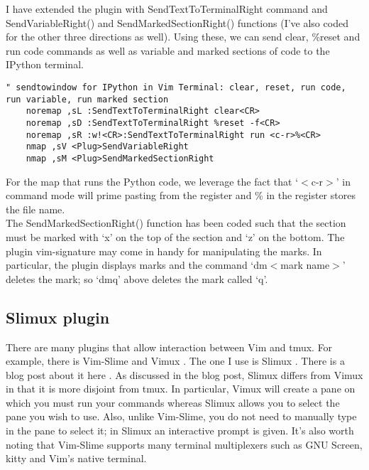 \documentclass[10pt]{article}
\newcommand{\tlangle}{$<$}
\newcommand{\trangle}{$>$}
\begin{document}
I have extended the plugin with SendTextToTerminalRight command and SendVariableRight()
and SendMarkedSectionRight() functions (I've also coded for the other three directions as
well). Using these, we can send clear, \%reset and run code commands as well as
variable and marked sections of code to the IPython terminal.
\begin{lstlisting}
" sendtowindow for IPython in Vim Terminal: clear, reset, run code, run variable, run marked section
    noremap ,sL :SendTextToTerminalRight clear<CR>
    noremap ,sD :SendTextToTerminalRight %reset -f<CR>
    noremap ,sR :w!<CR>:SendTextToTerminalRight run <c-r>%<CR>
    nmap ,sV <Plug>SendVariableRight
    nmap ,sM <Plug>SendMarkedSectionRight
\end{lstlisting}
For the map that runs the Python code, we leverage the fact that
`\tlangle c-r\trangle' in command mode will prime pasting from the register and
\% in the register stores the file name.\\

The SendMarkedSectionRight() function has been coded such that the section must
be marked with `x' on the top of the section and `z' on the bottom.  The plugin
vim-signature \cite{kshenoy2015signature} may come in handy for manipulating the
marks. In particular, the plugin displays marks and the command `dm\tlangle mark
name\trangle' deletes the mark; so `dmq' above deletes the mark called `q'.

\subsection{Slimux plugin}
There are many plugins that allow interaction between Vim and tmux. For example,
there is Vim-Slime \cite{jpalardy2012slime} and Vimux \cite{benmills2009vimux}.
The one I use is Slimux \cite{esamattis2015slimux}. There is a blog post about
it here \cite{suuronen2012slimux}. As discussed in the blog post, Slimux differs
from Vimux in that it is more disjoint from tmux. In particular, Vimux will
create a pane on which you must run your commands whereas Slimux allows you to
select the pane you wish to use. Also, unlike Vim-Slime, you do not need to
manually type in the pane to select it; in Slimux an interactive prompt is
given. It's also worth noting that Vim-Slime supports many terminal multiplexers
such as GNU Screen, kitty and Vim's native terminal.\\
\end{document}
